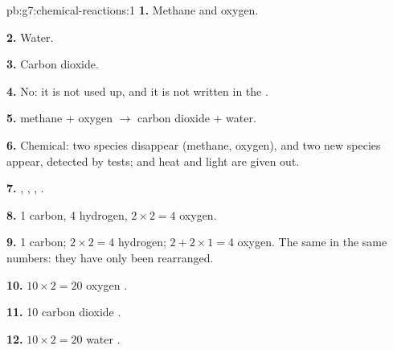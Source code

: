 \begin{solution}{pb:g7:chemical-reactions:1}
\textbf{1.} Methane and oxygen.

\textbf{2.} Water.

\textbf{3.} Carbon dioxide.

\textbf{4.} No: it is not used up, and it is not written in the .

\textbf{5.} methane $+$ oxygen $\longrightarrow$ carbon dioxide $+$
water.

\textbf{6.} Chemical: two species disappear (methane, oxygen), and two
new species appear, detected by tests; and heat and light are given out.

\textbf{7.} , , , .

\textbf{8.} 1 carbon, 4 hydrogen, $2 \times 2 = 4$ oxygen.

\textbf{9.} 1 carbon; $2 \times 2 = 4$ hydrogen; $2 + 2 \times 1 = 4$
oxygen. The same  in the same numbers: they have only been
rearranged.

\textbf{10.} $10 \times 2 = 20$ oxygen .

\textbf{11.} 10 carbon dioxide .

\textbf{12.} $10 \times 2 = 20$ water .
\end{solution}
